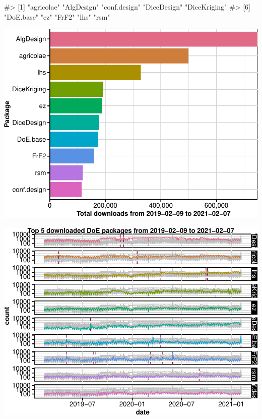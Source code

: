 \begin{Schunk}
\begin{Soutput}
#>  [1] "agricolae"   "AlgDesign"   "conf.design" "DiceDesign"  "DiceKriging"
#>  [6] "DoE.base"    "ez"          "FrF2"        "lhs"         "rsm"
\end{Soutput}
\end{Schunk}

\begin{Schunk}


\begin{center}\includegraphics{paper_files/figure-latex/download-barplot-1} \end{center}

\end{Schunk}

\begin{Schunk}


\begin{center}\includegraphics{paper_files/figure-latex/download-timeplot-1} \end{center}

\end{Schunk}

